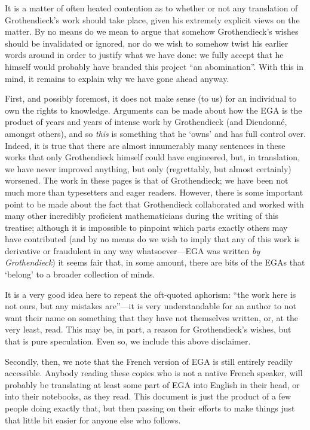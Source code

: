 \documentclass[openany,oneside]{amsbook}
\theoremstyle{ega-env-style}
\theoremstyle{ega-thm-env-style}
\theoremstyle{ega-defn-env-style}
\begin{document}
It is a matter of often heated contention as to whether or not any translation of Grothendieck's work should take place, given his extremely explicit views on the matter.
By no means do we mean to argue that somehow Grothendieck's wishes should be invalidated or ignored, nor do we wish to somehow twist his earlier words around in order to justify what we have done: we fully accept that he himself would probably have branded this project ``an abomination''.
With this in mind, it remains to explain why we have gone ahead anyway.

First, and possibly foremost, it does not make sense (to us) for an individual to own the rights to knowledge.
Arguments can be made about how the EGA is the product of years and years of intense work by Grothendieck (and Dieudonn\'{e}, amongst others), and so \emph{this} is something that he `owns' and has full control over.
Indeed, it is true that there are almost innumerably many sentences in these works that only Grothendieck himself could have engineered, but, in translation, we have never improved anything, but only (regrettably, but almost certainly) worsened.
The work in these pages is that of Grothendieck; we have been not much more than typesetters and eager readers.
However, there is some important point to be made about the fact that Grothendieck collaborated and worked with many other incredibly proficient mathematicians during the writing of this treatise; although it is impossible to pinpoint which parts exactly others may have contributed (and by no means do we wish to imply that any of this work is derivative or fraudulent in any way whatsoever---EGA was written \emph{by Grothendieck}) it seems fair that, in some amount, there are bits of the EGAs that `belong' to a broader collection of minds.

It is a very good idea here to repeat the oft-quoted aphorism: ``the work here is not ours, but any mistakes are''---it is very understandable for an author to not want their name on something that they have not themselves written, or, at the very least, read.
This may be, in part, a reason for Grothendieck's wishes, but that is pure speculation.
Even so, we include this above disclaimer.

Secondly, then, we note that the French version of EGA is still entirely readily accessible.
Anybody reading these copies who is not a native French speaker, will probably be translating at least some part of EGA into English in their head, or into their notebooks, as they read.
This document is just the product of a few people doing exactly that, but then passing on their efforts to make things just that little bit easier for anyone else who follows.
\end{document}
